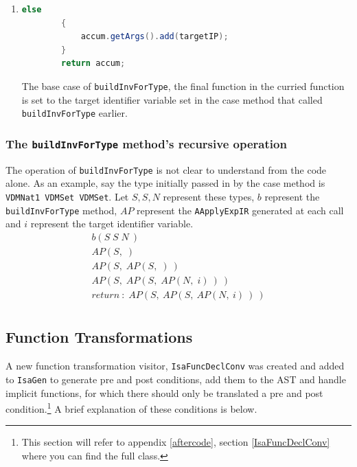 \begin{enumerate}
\begin{lstlisting}[language=Java]
    		accum.getArgs().add(buildInvForType(((ASeqSeqTypeIR) seqtNode).getSeqOf().clone()));
    	}
		\end{lstlisting}
		If the  \lstinline[language=Java]{setOf} or  \lstinline[language=Java]{seqOf} is a collection, and it is not a collection of nothing,\footnote{The last level of nesting in the nested collection could be an empty collection} then the argument of the  \lstinline[language=Java]{AApplyExpIR} is set as a recursive call to the  \lstinline[language=Java]{buildInvForType} method, with the \lstinline[language=Java]{setOf} or \lstinline[language=Java]{seqOf} type as its parameter,  \lstinline[language=Java]{buildInvForType} will do all of this again recursively for that nested type.
		\item \begin{lstlisting}[language=Java]
		else
    	{
    		accum.getArgs().add(targetIP);
    	}
    	return accum;
		\end{lstlisting}
		The base case of \lstinline[language=Java]{buildInvForType}, the final function in the curried function is set to the target identifier variable set in the case method that called \lstinline[language=Java]{buildInvForType} earlier.
	\end{enumerate}
	\subsubsection{The  \lstinline[language=Java]{buildInvForType} method's recursive operation}
	The operation of  \lstinline[language=Java]{buildInvForType} is not clear to understand from the code alone. As an example, say the type initially passed in by the case method is  \lstinline[language=Java]{VDMNat1 VDMSet VDMSet}. Let $S, S, N$ represent these types, $b$ represent the  \lstinline[language=Java]{buildInvForType} method, $AP$ represent the  \lstinline[language=Java]{AApplyExpIR} generated at each call and $i$ represent the target identifier variable.
	\begin{align}
		b(S\; S\; N\:)\\
		AP(S,\;)\\
		AP(S,\;AP(S,\;)\:)\\
		AP(S,\;AP(S,\;AP(N,\;i)\:)\:)\\
		return\:\colon\; AP(S,\:AP(S,\:AP(N,\:i)\:)\:)\\
	\end{align}
	\subsection{Function Transformations}
	A new function transformation visitor, \lstinline[language=Java]{IsaFuncDeclConv} was created and added to \lstinline[language=Java]{IsaGen} to generate pre and post conditions, add them to the AST and handle implicit functions, for which there should only be translated a pre and post condition.\footnote{This section will refer to appendix \ref{aftercode}, section \ref{IsaFuncDeclConv} where you can find the full class.} A brief explanation of these conditions is below.

